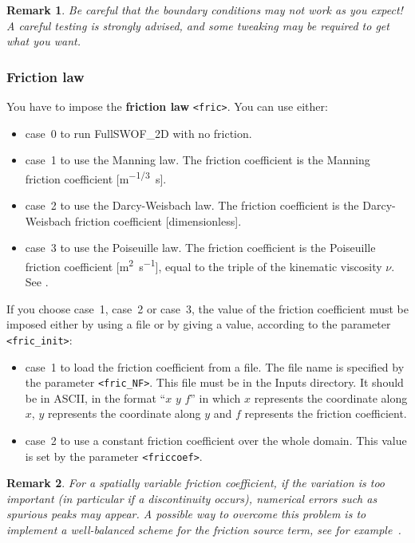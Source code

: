 \documentclass[a4paper, 11pt]{article}
\newcommand{\FullSWOF}{FullSWOF\_2D}
\newtheorem{rmk}{Remark}
\begin{document}
\begin{rmk}
	Be careful that the boundary conditions may not work as you expect!
	A careful testing is strongly advised, and some tweaking may be required to get what you want.
\end{rmk}

\subsubsection{Friction law}
You have to impose the \textbf{friction law} \texttt{<fric>}.
You can use either:
\begin{itemize}
	\item case~0 to run \FullSWOF{} with no friction.
	\item case~1 to use the Manning law.
	      The friction coefficient is the Manning friction coefficient [\si{\metre\tothe{-1/3}\second}].
	\item case~2 to use the Darcy-Weisbach law.
	      The friction coefficient is the Darcy-Weisbach friction coefficient [\si{dimensionless}].
	\item case~3 to use the Poiseuille law.
	      The friction coefficient is the Poiseuille friction coefficient [\si{\square\meter\per\second}], equal to the triple of the kinematic viscosity \(\nu\).
	      See \citet{Kirstetter16}.
\end{itemize}
If you choose case~1, case~2 or case~3, the value of the friction coefficient must be imposed either by using a file or by giving a value, according to the parameter \texttt{<fric\_init>}:
\begin{itemize}
	\item case~1 to load the friction coefficient from a file.
	      The file name is specified by the parameter \texttt{<fric\_NF>}.
	      This file must be in the \textsf{Inputs} directory.
	      It should be in ASCII, in the format ``\(x\) \(y\) \(f\)'' in which \(x\) represents the coordinate along \(x\), \(y\) represents the coordinate along \(y\) and \(f\) represents the friction coefficient.
	\item case~2 to use a constant friction coefficient over the whole domain.
	      This value is set by the parameter \texttt{<friccoef>}.
\end{itemize}
\begin{rmk}
	For a spatially variable friction coefficient, if the variation is too important (in particular if a discontinuity occurs), numerical errors such as spurious peaks may appear.
	A possible way to overcome this problem is to implement a well-balanced scheme for the friction source term, see for example~\citet{Bouchut04}.
\end{rmk}
\end{document}
